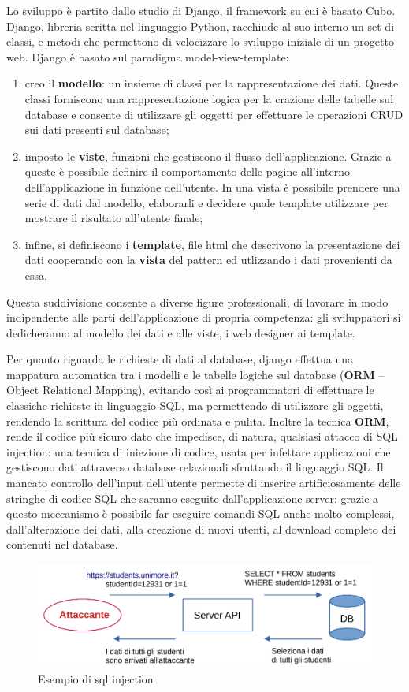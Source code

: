 \documentclass[12pt,a4paper]{article}
\begin{document}
Lo sviluppo è partito dallo studio di Django, il framework su cui è basato Cubo.
Django, libreria scritta nel linguaggio Python, racchiude al suo interno un set di classi, e metodi che permettono di velocizzare lo sviluppo iniziale di un progetto web. Django è basato sul paradigma model-view-template:
\begin{enumerate}
    \item creo il \textbf{modello}: un insieme di classi per la rappresentazione dei dati. Queste classi forniscono una rappresentazione logica per la crazione delle tabelle sul database e consente di utilizzare gli oggetti per effettuare le operazioni CRUD sui dati presenti sul database;
    \item imposto le \textbf{viste}, funzioni che gestiscono il flusso dell’applicazione. Grazie a queste è possibile definire il comportamento delle pagine all’interno dell’applicazione in funzione dell'utente. In una vista è possibile prendere una serie di dati dal modello, elaborarli e decidere quale template utilizzare per mostrare il risultato all’utente finale;
    \item infine, si definiscono i \textbf{template}, file html che descrivono la presentazione dei dati cooperando con la \textbf{vista} del pattern ed utlizzando i dati provenienti da essa.
\end{enumerate}

Questa suddivisione consente a diverse figure professionali, di lavorare in modo indipendente alle parti dell’applicazione di propria competenza: gli sviluppatori si dedicheranno al modello dei dati e alle viste, i web designer ai template.

Per quanto riguarda le richieste di dati al database, django effettua una mappatura automatica tra i modelli e le tabelle logiche sul database (\textbf{ORM} -- Object Relational Mapping), evitando così ai programmatori di effettuare le classiche richieste in linguaggio SQL, ma permettendo di utilizzare gli oggetti, rendendo la scrittura del codice più ordinata e pulita. Inoltre la tecnica \textbf{ORM}, rende il codice più sicuro dato che impedisce, di natura, qualsiasi attacco di SQL injection: una tecnica di iniezione di codice, usata per infettare applicazioni che gestiscono dati attraverso database relazionali sfruttando il linguaggio SQL. Il mancato controllo dell'input dell'utente permette di inserire artificiosamente delle stringhe di codice SQL che saranno eseguite dall'applicazione server: grazie a questo meccanismo è possibile far eseguire comandi SQL anche molto complessi, dall'alterazione dei dati, alla creazione di nuovi utenti, al download completo dei contenuti nel database.
\begin{figure}[H]
    \centering
    \includegraphics[width=1\linewidth]{sql_injection.png}
    \caption{Esempio di sql injection}
\end{figure}
\end{document}
